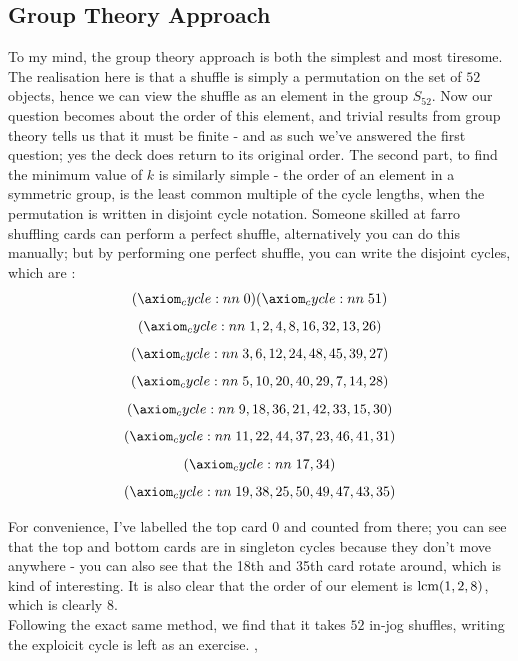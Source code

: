 \documentclass[../../Axiomathic.tex]{subfiles}
\begin{document}
\subsection{Group Theory Approach}
To my mind, the group theory approach is both the simplest and most tiresome. The realisation here is that a shuffle is simply a permutation on the set of $52$ objects, hence we can view the shuffle as an element in the group $S_{52}$. Now our question becomes about the order of this element, and trivial results from group theory tells us that it must be finite - and as such we've answered the first question; yes the deck does return to its original order. The second part, to find the minimum value of $k$ is similarly simple - the order of an element in a symmetric group, is the least common multiple of the cycle lengths, when the permutation is written in disjoint cycle notation. Someone skilled at farro shuffling cards can perform a perfect shuffle, alternatively you can do this manually; but by performing one perfect shuffle, you can write the disjoint cycles, which are :\[\cycle{0} \cycle{51}\] \[\cycle{1, 2, 4, 8, 16, 32, 13, 26}\] \[\cycle{3, 6, 12, 24, 48, 45, 39, 27}\]\[\cycle{5, 10, 20, 40, 29, 7, 14, 28}\]\[\cycle{9, 18, 36, 21, 42, 33, 15, 30}\] \[\cycle{11,22,44,37,23,46,41,31}\]\[ \cycle{17,34}\] \[\cycle{19,38,25,50,49,47,43,35}\]

For convenience, I've labelled the top card $0$ and counted from there; you can see that the top and bottom cards are in singleton cycles because they don't move anywhere - you can also see that the 18th and 35th card rotate around, which is kind of interesting. It is also clear that the order of our element is $\operatorname{lcm}(1,2,8)$, which is clearly 8.\\ 
Following the exact same method, we find that it takes $52$ in-jog shuffles, writing the exploicit cycle is left as an exercise. 
,
\end{document}
